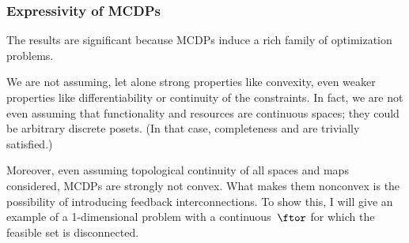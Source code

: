 \subsubsection{Expressivity of MCDPs}

The results are significant because MCDPs induce a rich family of
optimization problems. 

We are not assuming, let alone strong properties like convexity, even
weaker properties like differentiability or continuity of the constraints.
In fact, we are not even assuming that functionality and resources
are continuous spaces; they could be arbitrary discrete posets. (In
that case, completeness and \scottcontinuity are trivially satisfied.)

Moreover, even assuming topological continuity of all spaces and maps
considered, MCDPs are strongly not convex. What makes them nonconvex
is the possibility of introducing feedback interconnections. To show
this, I will give an example of a 1-dimensional problem with a continuous~$\ftor$
for which the feasible set is disconnected.


